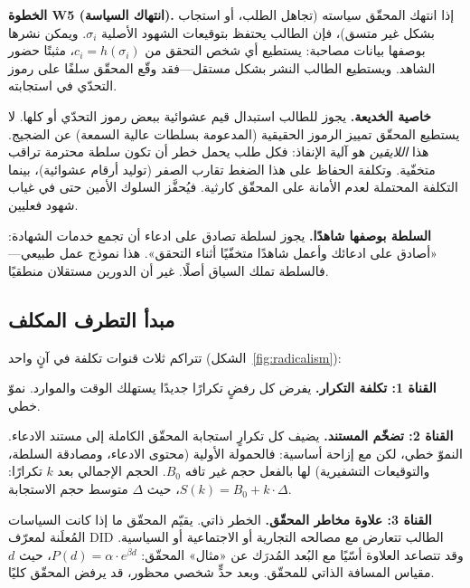 \documentclass[11pt,a4paper,twocolumn]{article}
\begin{document}
\textbf{الخطوة W5 (انتهاك السياسة).} إذا انتهك المحقّق سياسته (تجاهل الطلب، أو استجاب بشكل غير متسق)، فإن الطالب يحتفظ بتوقيعات الشهود الأصلية $\sigma_i$. ويمكن نشرها بوصفها بيانات مصاحبة: يستطيع أي شخص التحقق من $c_i = h(\sigma_i)$، مثبتًا حضور الشاهد. ويستطيع الطالب النشر بشكل مستقل---فقد وقّع المحقّق سلفًا على رموز التحدّي في استجابته.

\textbf{خاصية الخديعة.} يجوز للطالب استبدال قيم عشوائية ببعض رموز التحدّي أو كلها. لا يستطيع المحقّق تمييز الرموز الحقيقية (المدعومة بسلطات عالية السمعة) عن الضجيج. هذا \emph{اللايقين} هو آلية الإنفاذ: فكل طلب يحمل خطر أن تكون سلطة محترمة تراقب متخفّية. وتكلفة الحفاظ على هذا الضغط تقارب الصفر (توليد أرقام عشوائية)، بينما التكلفة المحتملة لعدم الأمانة على المحقّق كارثية. فيُحفَّز السلوك الأمين حتى في غياب شهود فعليين.

\textbf{السلطة بوصفها شاهدًا.} يجوز لسلطة تصادق على ادعاء أن تجمع خدمات الشهادة: «أصادق على ادعائك وأعمل شاهدًا متخفّيًا أثناء التحقق». هذا نموذج عمل طبيعي---فالسلطة تملك السياق أصلًا. غير أن الدورين مستقلان منطقيًا.

\subsection{مبدأ التطرف المكلف}

تتراكم ثلاث قنوات تكلفة في آنٍ واحد (الشكل~\ref{fig:radicalism}):

\textbf{القناة 1: تكلفة التكرار.} يفرض كل رفضٍ تكرارًا جديدًا يستهلك الوقت والموارد. نموّ خطي.

\textbf{القناة 2: تضخّم المستند.} يضيف كل تكرارٍ استجابة المحقّق الكاملة إلى مستند الادعاء. النموّ خطي، لكن مع إزاحة أساسية: فالحمولة الأولية (محتوى الادعاء، ومصادقة السلطة، والتوقيعات التشفيرية) لها بالفعل حجم غير تافه $B_0$. الحجم الإجمالي بعد $k$ تكرارًا: $S(k) = B_0 + k \cdot \Delta$، حيث $\Delta$ متوسط حجم الاستجابة.

\textbf{القناة 3: علاوة مخاطر المحقّق.} الخطر ذاتي. يقيّم المحقّق ما إذا كانت السياسات المُعلَنة لمعرّف DID الطالب تتعارض مع مصالحه التجارية أو الاجتماعية أو السياسية. وقد تتصاعد العلاوة أسّيًا مع البُعد المُدرَك عن «مثال» المحقّق: $P(d) = \alpha \cdot e^{\beta d}$، حيث $d$ مقياس المسافة الذاتي للمحقّق. وبعد حدٍّ شخصي محظور، قد يرفض المحقّق كليًا.
\end{document}
